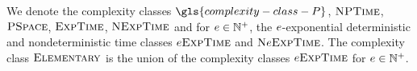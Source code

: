 We denote the complexity classes $\gls{complexity-class-P}$, $\cNP$,
$\cPSpace$, $\cExpTime$, $\cNExpTime$ and for $\expe \in \pNats$, the
$\expe$-exponential deterministic and nondeterministic time classes
$\ceExpTime\expe$ and $\ceNExpTime\expe$.
The complexity class $\cElementary$ is the union of the complexity classes
$\ceExpTime\expe$ for $\expe \in \pNats$.